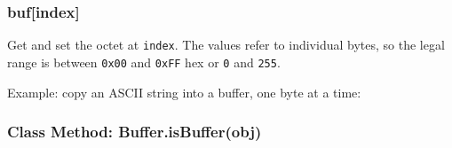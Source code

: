 \begin{Shaded}
\begin{Highlighting}[]
  \NormalTok{);}
 


  

\end{Highlighting}
\end{Shaded}

\subsubsection{buf{[}index{]}}

Get and set the octet at \texttt{index}. The values refer to individual
bytes, so the legal range is between \texttt{0x00} and \texttt{0xFF} hex
or \texttt{0} and \texttt{255}.

Example: copy an ASCII string into a buffer, one byte at a time:

\begin{Shaded}
\begin{Highlighting}[]
\NormalTok{;}
 \NormalTok{);}

 \NormalTok{(}  
\NormalTok{\}}


\end{Highlighting}
\end{Shaded}

\subsubsection{Class Method: Buffer.isBuffer(obj)}

